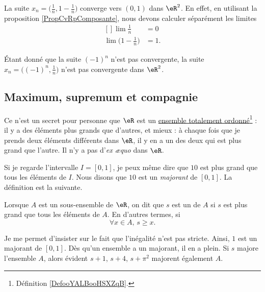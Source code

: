 \begin{example}
	La suite $x_n=\big( \frac{1}{ n },1-\frac{1}{ n } \big)$ converge vers $(0,1)$ dans $\eR^2$. En effet, en utilisant la proposition \ref{PropCvRpComposante}, nous devons calculer séparément les limites
	\begin{equation}
		\begin{aligned}[]
			\lim\frac{1}{ n }&=0\\
			\lim\big( 1-\frac{1}{ n } \big)&=1.
		\end{aligned}
	\end{equation}
\end{example}

\begin{example}
	Étant donné que la suite $(-1)^n$ n'est pas convergente, la suite $x_n=\big( (-1)^n,\frac{1}{ n } \big)$ n'est pas convergente dans $\eR^2$.
\end{example}

\subsection{Maximum, supremum et compagnie}

Ce n'est un secret pour personne que $\eR$ est un \href{http://fr.wikipedia.org/wiki/Relation_d'ordre}{ensemble totalement ordonné}\footnote{Définition \ref{DefooYALBooHSXZqB}.} : il y a des éléments plus grands que d'autres, et mieux : à chaque fois que je prends deux éléments différents dans $\eR$, il y en a un des deux qui est plus grand que l'autre. Il n'y a pas d'\emph{ex æquo} dans $\eR$.

  Si je regarde l'intervalle $I=[0,1]$, je peux même dire que $10$ est plus grand que tous les éléments de $I$. Nous disons que $10$ est un \emph{majorant} de $[0,1]$. La définition est la suivante.
\begin{definition}
Lorsque $A$ est un sous-ensemble de $\eR$, on dit que $s$ est un  de $A$ si $s$ est plus grand que tous les éléments de $A$. En d'autres termes, si
\[
  \forall x\in A,\,s\geq x.
\]
\end{definition}
Je me permet d'insister sur le fait que l'inégalité n'est pas stricte. Ainsi, $1$ est un majorant de $[0,1]$. Dès qu'un ensemble a un majorant, il en a plein. Si $s$ majore l'ensemble $A$, alors évident $s+1$, $s+4$, $s+\pi^2$ majorent également $A$.

